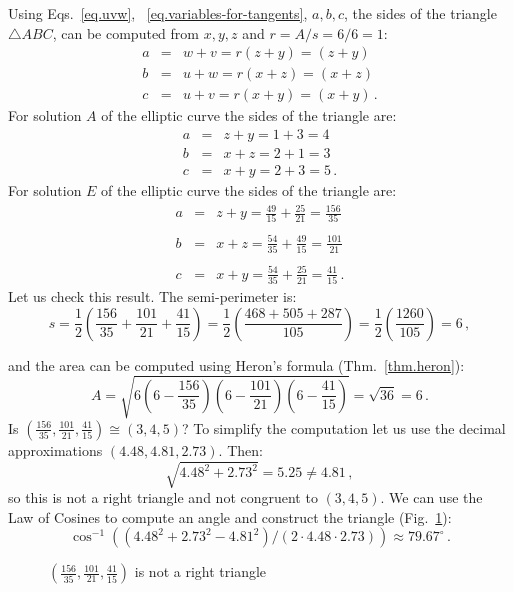 Using Eqs.~\ref{eq.uvw}, ~\ref{eq.variables-for-tangents}, $a,b,c$, the sides of the triangle $\triangle ABC$, can be computed from $x,y,z$ and $r=A/s=6/6=1$:
%
\begin{eqnarray*}
a&=&w+v = r(z+y)=(z+y)\\
b&=&u+w= r(x+z)=(x+z)\\
c&=&u+v=r(x+y)=(x+y)\,.
\end{eqnarray*}
For solution $A$ of the elliptic curve the sides of the triangle are:
\begin{eqnarray*}
a &=& z+y = 1+3 = 4\\
b &=& x+z = 2+1=3\\
c &=& x+y = 2+3=5\,.
\end{eqnarray*}
For solution $E$ of the elliptic curve the sides of the triangle are:
\begin{eqnarray*}
a &=& z+y = \frac{49}{15} + \frac{25}{21} = \frac{156}{35}\\
&&\\
b &=& x+z = \frac{54}{35} + \frac{49}{15} = \frac{101}{21}\\
&&\\
c &=& x+y = \frac{54}{35} + \frac{25}{21} =\frac{41}{15}\,.
\end{eqnarray*}
Let us check this result. The semi-perimeter is:
\[
s=\frac{1}{2}\left(\frac{156}{35} + \frac{101}{21}+\frac{41}{15}\right) = \frac{1}{2}\left(\frac{468+505+287}{105}\right) = \frac{1}{2}\left(\frac{1260}{105}\right)= 6\,,
\]

\newpage

\noindent{}and the area can be computed using Heron's formula (Thm.~\ref{thm.heron}):
\[
A= \sqrt{6 \left(6-\frac{156}{35}\right) \left(6-\frac{101}{21}\right) \left(6-\frac{41}{15}\right)}=\sqrt{36} = 6\,.
\]
Is $\left(\frac{156}{35}, \frac{101}{21}, \frac{41}{15}\right)\cong(3,4,5)$? To simplify the computation let us use the decimal approximations $(4.48,4.81,2.73)$. Then:
\[
\sqrt{4.48^2+2.73^2}=5.25\neq 4.81\,,
\]
so this is not a right triangle and not congruent to $(3,4,5)$.
We can use the Law of Cosines to compute an angle and construct the triangle (Fig.~\ref{f.not-a-right-triangle}):
\[
\cos^{-1}\left((4.48^2+2.73^2 - 4.81^2)/(2\cdot 4.48\cdot 2.73)\right)\approx 79.67^\circ\,.
\]

\begin{figure}[t]
\begin{center}
\end{center}
\caption{$\left(\frac{156}{35}, \frac{101}{21}, \frac{41}{15}\right)$ is not a right triangle}\label{f.not-a-right-triangle}
\end{figure}

